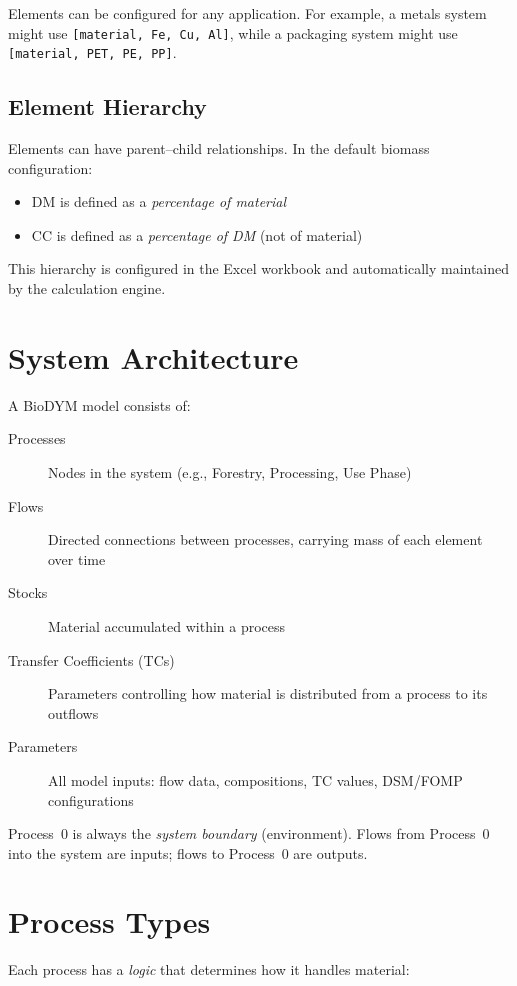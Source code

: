 Elements can be configured for any application. For example, a metals system might use \texttt{[material, Fe, Cu, Al]}, while a packaging system might use \texttt{[material, PET, PE, PP]}.

\subsection{Element Hierarchy}

Elements can have parent--child relationships. In the default biomass configuration:
\begin{itemize}
  \item DM is defined as a \emph{percentage of material}
  \item CC is defined as a \emph{percentage of DM} (not of material)
\end{itemize}

This hierarchy is configured in the Excel workbook and automatically maintained by the calculation engine.

\section{System Architecture}

A BioDYM model consists of:
\begin{description}
  \item[Processes] Nodes in the system (e.g., Forestry, Processing, Use Phase)
  \item[Flows] Directed connections between processes, carrying mass of each element over time
  \item[Stocks] Material accumulated within a process
  \item[Transfer Coefficients (TCs)] Parameters controlling how material is distributed from a process to its outflows
  \item[Parameters] All model inputs: flow data, compositions, TC values, DSM/FOMP configurations
\end{description}

Process~0 is always the \emph{system boundary} (environment). Flows from Process~0 into the system are inputs; flows to Process~0 are outputs.

\section{Process Types}

Each process has a \emph{logic} that determines how it handles material:

